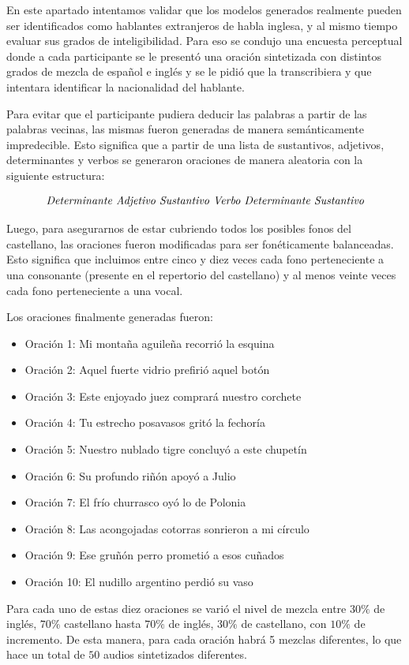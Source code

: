 
En este apartado intentamos validar que los modelos generados realmente pueden ser identificados como hablantes extranjeros de habla inglesa, y al mismo tiempo evaluar sus grados de inteligibilidad. Para eso se condujo una encuesta perceptual donde a cada participante se le presentó una oración sintetizada con distintos grados de mezcla de español e inglés y se le pidió que la transcribiera y que intentara identificar la nacionalidad del hablante. 

Para evitar que el participante pudiera deducir las palabras a partir de las palabras vecinas, las mismas fueron generadas de manera semánticamente impredecible. Esto significa que a partir de una lista de sustantivos, adjetivos, determinantes y verbos se generaron oraciones de manera aleatoria con la siguiente estructura:

$$\textnormal{\textit{Determinante Adjetivo Sustantivo Verbo Determinante Sustantivo}}$$

Luego, para asegurarnos de estar cubriendo todos los posibles fonos del castellano, las oraciones fueron modificadas para ser fonéticamente balanceadas. Esto significa que incluimos entre cinco y diez veces cada fono perteneciente a una consonante (presente en el repertorio del castellano) y al menos veinte veces cada fono perteneciente a una vocal.

Los oraciones finalmente generadas fueron:

\begin{itemize}
\item Oración 1: Mi montaña aguileña recorrió la esquina
\item Oración 2: Aquel fuerte vidrio prefirió aquel botón
\item Oración 3: Este enjoyado juez comprará nuestro corchete
\item Oración 4: Tu estrecho posavasos gritó la fechoría
\item Oración 5: Nuestro nublado tigre concluyó a este chupetín
\item Oración 6: Su profundo riñón apoyó a Julio
\item Oración 7: El frío churrasco oyó lo de Polonia
\item Oración 8: Las acongojadas cotorras sonrieron a mi círculo
\item Oración 9: Ese gruñón perro prometió a esos cuñados
\item Oración 10: El nudillo argentino perdió su vaso
\end{itemize}

Para cada uno de estas diez oraciones se varió el nivel de mezcla entre $30\%$ de inglés, $70\%$ castellano hasta $70\%$ de inglés, $30\%$ de castellano, con $10\%$ de incremento. De esta manera, para cada oración habrá 5 mezclas diferentes, lo que hace un total de $50$ audios sintetizados diferentes.

